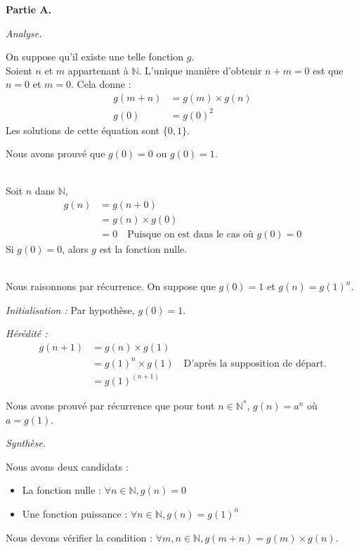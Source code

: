 \documentclass[]{../templates/homework}
\begin{document}
\textbf{Partie A.}

\subproblem
\textit{Analyse.}

On suppose qu'il existe une telle fonction $g$.
\question \\
Soient $n$ et $m$ appartenant à $\mathbb{N}$. L'unique manière d'obtenir $n + m = 0$ est que $n = 0$ et $m = 0$.
Cela donne :
\begin{align*}
	g(m + n) & = g(m) \times g(n) \\
	g(0)     & = g(0)^2
\end{align*}
Les solutions de cette équation sont $\{0, 1\}$.

Nous avons prouvé que $g(0) = 0$ ou $g(0) = 1$.

\question \\
Soit $n$ dans $\mathbb{N}$,
\begin{align*}
	g(n) & = g(n + 0) \\
	& = g(n) \times g(0) \\
	& = 0 \quad \text{Puisque on est dans le cas où $g(0) = 0$}
\end{align*}
Si $g(0) = 0$, alors $g$ est la fonction nulle.

\question \\
Nous raisonnons par récurrence. On suppose que $g(0) = 1$ et $g(n) = g(1)^n$.

\textit{Initialisation :}
Par hypothèse, $g(0) = 1$.

\textit{Hérédité :}
\begin{align*}
	g(n + 1) &= g(n) \times g(1) \\
	&= g(1)^n \times g(1) \quad \text{D'après la supposition de départ.} \\
	&= g(1)^{(n + 1)}
\end{align*}

Nous avons prouvé par récurrence que pour tout $n \in \mathbb{N^*}$, $g(n) = a^n$ où $a=g(1)$.

\subproblem
\textit{Synthèse.}

Nous avons deux candidats :
\begin{itemize}
	\item La fonction nulle : $\forall n \in \mathbb{N}, g(n) = 0$
	\item Une fonction puissance : $\forall n \in \mathbb{N}, g(n) = g(1)^n$
\end{itemize}
Nous devons vérifier la condition : $\forall m, n \in \mathbb{N}, g(m + n) = g(m) \times g(n)$.
\end{document}

